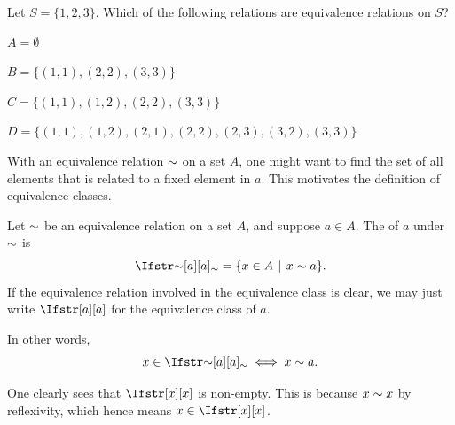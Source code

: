 \begin{exercise}
    Let $S = \{1, 2, 3\}$. Which of the following relations are equivalence relations on $S$?
    \begin{partquestions}{\alph*}
        \item $A = \emptyset$
        \item $B = \{(1, 1), (2, 2), (3, 3)\}$
        \item $C = \{(1, 1), (1, 2), (2, 2), (3, 3)\}$
        \item $D = \{(1, 1), (1, 2), (2, 1), (2, 2), (2, 3), (3, 2), (3, 3)\}$
    \end{partquestions}
\end{exercise}

With an equivalence relation $\sim$ on a set $A$, one might want to find the set of all elements that is related to a fixed element in $a$. This motivates the definition of equivalence classes.

\begin{definition}
    Let $\sim$ be an equivalence relation on a set $A$, and suppose $a \in A$. The  of $a$ under $\sim$ is
    \[
        \EqClass[\EqRel]{a} = \{x \in A \vert x \EqRel a\}.
    \]
    If the equivalence relation involved in the equivalence class is clear, we may just write $\EqClass{a}$ for the equivalence class of $a$.
\end{definition}
In other words,
\[
    x \in \EqClass[\EqRel]{a} \iff x \EqRel a.
\]

One clearly sees that $\EqClass{x}$ is non-empty. This is because $x \sim x$ by reflexivity, which hence means $x \in \EqClass{x}$.

